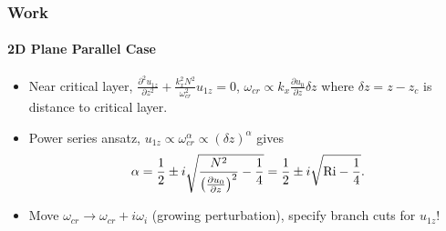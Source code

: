 \documentclass[dvipsnames]{beamer}
\newcommand*{\pd}[2]{\frac{\partial#1}{\partial#2}}
\newcommand*{\ptd}[2]{\frac{\partial^2 #1}{\partial#2^2}}
\DeclarePairedDelimiter\p{\lparen}{\rparen}
\begin{document}
\begin{frame}
    \frametitle{Work}
    \framesubtitle{2D Plane Parallel Case}

    \begin{itemize}
        \item Near critical layer, $\ptd{u_{1z}}{z} +
            \frac{k_x^2N^2}{\omega_{cr}^2}u_{1z} = 0$, $\omega_{cr} \propto k_x
            \pd{u_0}{z}\delta z$ where $\delta z = z - z_c$ is distance to
            critical layer.

        \item Power series ansatz, $u_{1z} \propto \omega_{cr}^\alpha \propto
            (\delta z)^{\alpha}$ gives
            \begin{equation}
                \alpha = \frac{1}{2}\pm i\sqrt{\frac{N^2}{\p*{\pd{u_0}{z}}^2} -
                    \frac{1}{4}} = \frac{1}{2}
                        \pm i\sqrt{\mathrm{Ri} - \frac{1}{4}}.
            \end{equation}

        \item Move $\omega_{cr} \to \omega_{cr} + i\omega_i$ (growing
            perturbation), specify branch cuts for $u_{1z}$!

        \begin{figure}[t]
            \centering
        \end{figure}
    \end{itemize}
\end{frame}
\end{document}

